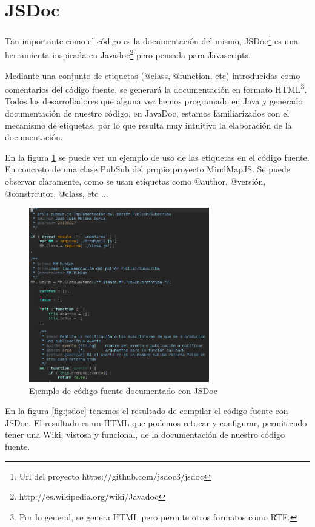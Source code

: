 \section{JSDoc}

Tan importante como el código es la documentación del mismo, JSDoc\footnote{Url del proyecto https://github.com/jsdoc3/jsdoc} es una herramienta inspirada en Javadoc\footnote{http://es.wikipedia.org/wiki/Javadoc} pero pensada para Javascripts. 

Mediante una conjunto de etiquetas (@class, @function, etc) introducidas como comentarios del código fuente,  se generará la documentación en formato HTML\footnote{Por lo general, se genera HTML pero permite otros formatos como RTF.}. Todos los desarrolladores que alguna vez hemos programado en Java y generado documentación de nuestro código, en JavaDoc, estamos familiarizados con el mecanismo de etiquetas, por lo que resulta muy intuitivo la elaboración de la documentación. 

En la figura \ref{fig:codigoconjsdoc} se puede ver un ejemplo de uso de las etiquetas en el código fuente. En concreto de una clase PubSub del propio proyecto MindMapJS. Se puede observar claramente, como se usan etiquetas como @author, @versión, @constrcutor, @class, etc ...  

\begin{figure}[htbp]
\centering
\includegraphics[width=0.7\textwidth]{imagenes/codigoconjsdoc}
\caption{Ejemplo de código fuente documentado con JSDoc}
\label{fig:codigoconjsdoc}
\end{figure}


En la figura \ref{fig:jsdoc} tenemos el resultado de compilar el código fuente con JSDoc. El resultado es un HTML que podemos retocar y configurar, permitiendo tener una Wiki, vistosa y funcional, de la documentación de nuestro código fuente.

